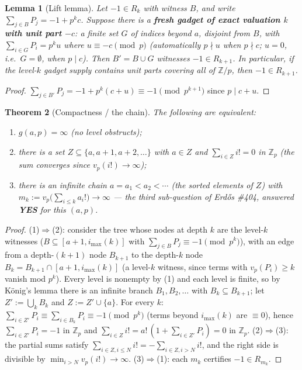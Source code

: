 \documentclass{article}
\newtheorem{theorem}{Theorem}
\newtheorem{lemma}[theorem]{Lemma}
\newcommand{\vpp}{v_p}
\newcommand{\Zp}{\mathbb{Z}_p}
\begin{document}
\begin{lemma}[Lift lemma]\label{lem:lift}
Let $-1 \in R_k$ with witness $B$, and write $\sum_{j\in B}P_j = -1 + p^k c$.
Suppose there is a \textbf{fresh gadget of exact valuation $k$ with unit part
$-c$}: a finite set $G$ of indices beyond $a$, disjoint from $B$, with
$\sum_{i\in G}P_i = p^k u$ where $u \equiv -c \pmod p$ (automatically
$p \nmid u$ when $p \nmid c$; $u = 0$, i.e.\ $G = \emptyset$, when $p \mid c$).
Then $B' = B \cup G$ witnesses $-1 \in R_{k+1}$.
In particular, if the level-$k$ gadget supply contains unit parts covering
all of $\mathbb{Z}/p$, then $-1 \in R_{k+1}$.
\end{lemma}
\begin{proof}
$\sum_{j \in B'}P_j = -1 + p^k(c + u) \equiv -1 \pmod{p^{k+1}}$ since
$p \mid c + u$.
\end{proof}

\begin{theorem}[Compactness / the chain]\label{thm:chain}
The following are equivalent:
\begin{enumerate}
\item $g(a,p) = \infty$ (no level obstructs);
\item there is a set $Z \subseteq \{a, a{+}1, a{+}2, \ldots\}$ with $a \in Z$
and $\sum_{i \in Z} i! = 0$ in $\Zp$ (the sum converges since $\vpp(i!) \to \infty$);
\item there is an infinite chain $a = a_1 < a_2 < \cdots$ (the sorted elements
of $Z$) with $m_k := \vpp\bigl(\sum_{i \le k} a_i!\bigr) \to \infty$
--- the third sub-question of Erd\H{o}s \#404, answered \textbf{YES} for this $(a,p)$.
\end{enumerate}
\end{theorem}
\begin{proof}
(1)$\Rightarrow$(2): consider the tree whose nodes at depth $k$ are the
level-$k$ witnesses ($B \subseteq [a{+}1, i_{\max}(k)]$ with
$\sum_{j\in B}P_j \equiv -1 \pmod{p^k}$), with an edge from a depth-$(k{+}1)$
node $B_{k+1}$ to the depth-$k$ node $B_k = B_{k+1} \cap [a{+}1, i_{\max}(k)]$
(a level-$k$ witness, since terms with $\vpp(P_i) \ge k$ vanish mod $p^k$).
Every level is nonempty by (1) and each level is finite, so by K\"onig's
lemma there is an infinite branch $B_1, B_2, \ldots$ with
$B_k \subseteq B_{k+1}$; let $Z' := \bigcup_k B_k$ and $Z := Z' \cup \{a\}$.
For every $k$: $\sum_{i \in Z'}P_i \equiv \sum_{i\in B_k}P_i \equiv -1
\pmod{p^k}$ (terms beyond $i_{\max}(k)$ are $\equiv 0$), hence
$\sum_{i\in Z'}P_i = -1$ in $\Zp$ and $\sum_{i\in Z}i! =
a!\,(1 + \sum_{i \in Z'}P_i) = 0$ in $\Zp$.
(2)$\Rightarrow$(3): the partial sums satisfy
$\sum_{i \in Z, i \le N} i! = -\sum_{i \in Z, i > N} i!$, and the right side
is divisible by $\min_{i > N} \vpp(i!) \to \infty$.
(3)$\Rightarrow$(1): each $m_k$ certifies $-1 \in R_{m_k}$.
\end{proof}
\end{document}
